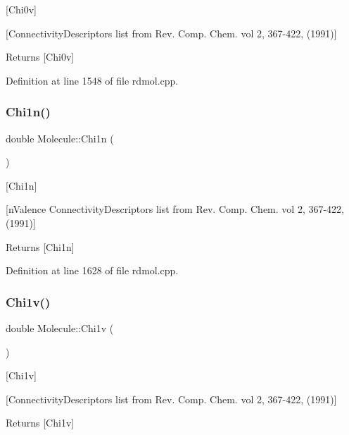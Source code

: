 \mbox{[}Chi0v\mbox{]} 

\mbox{[}Connectivity\+Descriptors list from Rev. Comp. Chem. vol 2, 367-\/422, (1991)\mbox{]}

\begin{DoxyReturn}{Returns}
\mbox{[}Chi0v\mbox{]} 
\end{DoxyReturn}


Definition at line 1548 of file rdmol.\+cpp.

\mbox{\label{class_molecule_a68d5354a45b3e01b372b1a8052b37a93}} 
\subsubsection{\texorpdfstring{Chi1n()}{Chi1n()}}
{\footnotesize\ttfamily double Molecule\+::\+Chi1n (\begin{DoxyParamCaption}{ }\end{DoxyParamCaption})}



\mbox{[}Chi1n\mbox{]} 

\mbox{[}n\+Valence Connectivity\+Descriptors list from Rev. Comp. Chem. vol 2, 367-\/422, (1991)\mbox{]}

\begin{DoxyReturn}{Returns}
\mbox{[}Chi1n\mbox{]} 
\end{DoxyReturn}


Definition at line 1628 of file rdmol.\+cpp.

\mbox{\label{class_molecule_a867c7ad16812f1aafac38087eec756f4}} 
\subsubsection{\texorpdfstring{Chi1v()}{Chi1v()}}
{\footnotesize\ttfamily double Molecule\+::\+Chi1v (\begin{DoxyParamCaption}{ }\end{DoxyParamCaption})}



\mbox{[}Chi1v\mbox{]} 

\mbox{[}Connectivity\+Descriptors list from Rev. Comp. Chem. vol 2, 367-\/422, (1991)\mbox{]}

\begin{DoxyReturn}{Returns}
\mbox{[}Chi1v\mbox{]} 
\end{DoxyReturn}


